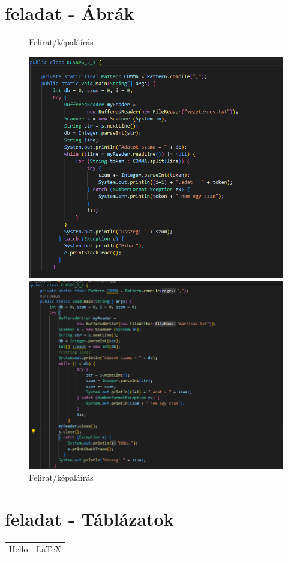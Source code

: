 \documentclass{article}
\begin{document}
\section{feladat - Ábrák}

\hulipsum[1]

\begin{figure}[bt] %
	\centering
	\label{fig:kepek}
	\caption{Felirat/képaláírás}
	\includegraphics[width=0.5\linewidth]{1}
	\caption{Felirat/képaláírás}
	\includegraphics[width=0.5\linewidth, angle = 90]{2}
\end{figure}

\hulipsum[1]

\section{feladat - Táblázatok}
\begin{tabular}{|p{3cm} | p{5cm} |}
	\hline
	Hello& \LaTeX
\end{tabular}
\end{document}

